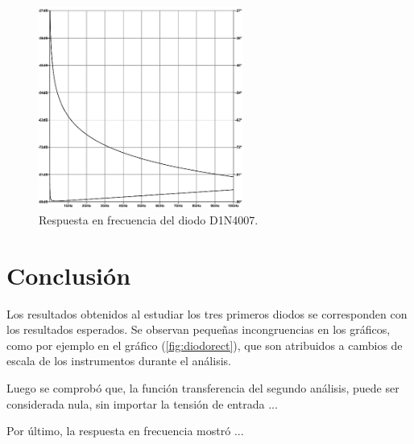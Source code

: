 \documentclass[a4paper]{article}
\begin{document}
\begin{figure}[H]
	\centering
	\includegraphics[width=0.6\textwidth]{RtaF3_2}					%
	\caption{Respuesta en frecuencia del diodo D1N4007.}
	\label{fig:rtaf}
\end{figure}

\section*{Conclusión}

Los resultados obtenidos al estudiar los tres primeros diodos se corresponden con los resultados esperados. Se observan pequeñas incongruencias en los gráficos, como por ejemplo en el gráfico (\ref{fig:diodorect}), que son atribuidos a cambios de escala de los instrumentos durante el análisis.

Luego se comprobó que, la función transferencia del segundo análisis, puede ser considerada nula, sin importar la tensión de entrada ...

Por último, la respuesta en frecuencia mostró ...
\end{document}
